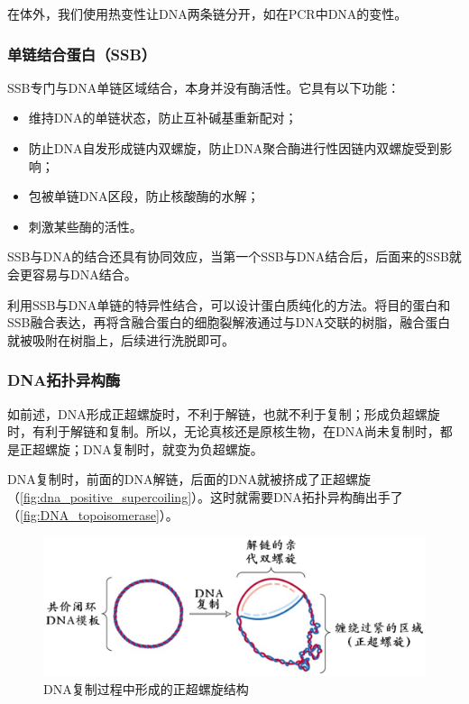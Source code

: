 在体外，我们使用热变性让DNA两条链分开，如在PCR中DNA的变性。

\subsubsection{单链结合蛋白（SSB）}

SSB专门与DNA单链区域结合，本身并没有酶活性。它具有以下功能：

\begin{itemize}
	\item 维持DNA的单链状态，防止互补碱基重新配对；
	\item 防止DNA自发形成链内双螺旋，防止DNA聚合酶进行性因链内双螺旋受到影响；
	\item 包被单链DNA区段，防止核酸酶的水解；
	\item 刺激某些酶的活性。
\end{itemize}

SSB与DNA的结合还具有协同效应，当第一个SSB与DNA结合后，后面来的SSB就会更容易与DNA结合。

利用SSB与DNA单链的特异性结合，可以设计蛋白质纯化的方法。将目的蛋白和SSB融合表达，再将含融合蛋白的细胞裂解液通过与DNA交联的树脂，融合蛋白就被吸附在树脂上，后续进行洗脱即可。

\subsubsection{DNA拓扑异构酶}

如前述，DNA形成正超螺旋时，不利于解链，也就不利于复制；形成负超螺旋时，有利于解链和复制。所以，无论真核还是原核生物，在DNA尚未复制时，都是正超螺旋；DNA复制时，就变为负超螺旋。

DNA复制时，前面的DNA解链，后面的DNA就被挤成了正超螺旋（\autoref{fig:dna_positive_supercoiling}）。这时就需要DNA拓扑异构酶出手了（\autoref{fig:DNA_topoisomerase}）。

\begin{figure}[h]
	\centering
	\includegraphics[width=0.7\linewidth]{Pics/DNA形成正超螺旋}
	\caption{DNA复制过程中形成的正超螺旋结构}
	\label{fig:dna_positive_supercoiling}
\end{figure}

